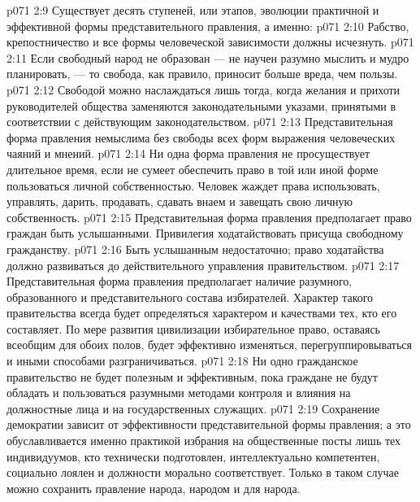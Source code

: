 \vs p071 2:9 \pc Существует десять ступеней, или этапов, эволюции практичной и эффективной формы представительного правления, а именно:
\vs p071 2:10 \bibnobreakspace {} Рабство, крепостничество и все формы человеческой зависимости должны исчезнуть.
\vs p071 2:11 \pc {}\bibnobreakspace {} Если свободный народ не образован --- не научен разумно мыслить и мудро планировать, --- то свобода, как правило, приносит больше вреда, чем пользы.
\vs p071 2:12 \pc {}\bibnobreakspace {} Свободой можно наслаждаться лишь тогда, когда желания и прихоти руководителей общества заменяются законодательными указами, принятыми в соответствии с действующим законодательством.
\vs p071 2:13 \pc {}\bibnobreakspace {} Представительная форма правления немыслима без свободы всех форм выражения человеческих чаяний и мнений.
\vs p071 2:14 \pc {}\bibnobreakspace {} Ни одна форма правления не просуществует длительное время, если не сумеет обеспечить право в той или иной форме пользоваться личной собственностью. Человек жаждет права использовать, управлять, дарить, продавать, сдавать внаем и завещать свою личную собственность.
\vs p071 2:15 \pc {}\bibnobreakspace {} Представительная форма правления предполагает право граждан быть услышанными. Привилегия ходатайствовать присуща свободному гражданству.
\vs p071 2:16 \pc {}\bibnobreakspace {} Быть услышанным недостаточно; право ходатайства должно развиваться до действительного управления правительством.
\vs p071 2:17 \pc {}\bibnobreakspace {} Представительная форма правления предполагает наличие разумного, образованного и представительного состава избирателей. Характер такого правительства всегда будет определяться характером и качествами тех, кто его составляет. По мере развития цивилизации избирательное право, оставаясь всеобщим для обоих полов, будет эффективно изменяться, перегруппировываться и иными способами разграничиваться.
\vs p071 2:18 \pc {}\bibnobreakspace {} Ни одно гражданское правительство не будет полезным и эффективным, пока граждане не будут обладать и пользоваться разумными методами контроля и влияния на должностные лица и на государственных служащих.
\vs p071 2:19 \pc {}\bibnobreakspace {} Сохранение демократии зависит от эффективности представительной формы правления; а это обуславливается именно практикой избрания на общественные посты лишь тех индивидуумов, кто технически подготовлен, интеллектуально компетентен, социально лоялен и должности морально соответствует. Только в таком случае можно сохранить правление народа, народом и для народа.
